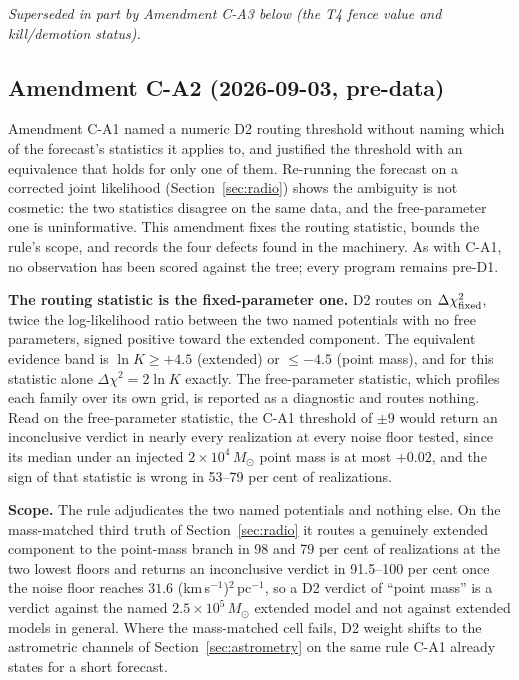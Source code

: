 \documentclass[11pt]{article}
\newcommand{\msun}{\ensuremath{M_\odot}}
\begin{document}
\textit{Superseded in part by Amendment C-A3 below (the T4 fence value and kill/demotion status).}

\subsection{Amendment C-A2 (2026-09-03, pre-data)}
\label{sec:amendmentca2}

Amendment C-A1 named a numeric D2 routing threshold without naming which of the forecast's statistics it applies to, and justified the threshold with an equivalence that holds for only one of them. Re-running the forecast on a corrected joint likelihood (Section~\ref{sec:radio}) shows the ambiguity is not cosmetic: the two statistics disagree on the same data, and the free-parameter one is uninformative. This amendment fixes the routing statistic, bounds the rule's scope, and records the four defects found in the machinery. As with C-A1, no observation has been scored against the tree; every program remains pre-D1.

\textbf{The routing statistic is the fixed-parameter one.} D2 routes on $\Delta\chi^{2}_{\rm fixed}$, twice the log-likelihood ratio between the two named potentials with no free parameters, signed positive toward the extended component. The equivalent evidence band is $\ln K \geq +4.5$ (extended) or $\leq -4.5$ (point mass), and for this statistic alone $\Delta\chi^{2} = 2\ln K$ exactly. The free-parameter statistic, which profiles each family over its own grid, is reported as a diagnostic and routes nothing. Read on the free-parameter statistic, the C-A1 threshold of $\pm9$ would return an inconclusive verdict in nearly every realization at every noise floor tested, since its median under an injected $2\times10^{4}\,\msun$ point mass is at most $+0.02$, and the sign of that statistic is wrong in 53--79 per cent of realizations.

\textbf{Scope.} The rule adjudicates the two named potentials and nothing else. On the mass-matched third truth of Section~\ref{sec:radio} it routes a genuinely extended component to the point-mass branch in 98 and 79 per cent of realizations at the two lowest floors and returns an inconclusive verdict in 91.5--100 per cent once the noise floor reaches $31.6$ (km\,s$^{-1}$)$^{2}$\,pc$^{-1}$, so a D2 verdict of ``point mass'' is a verdict against the named $2.5\times10^{5}\,\msun$ extended model and not against extended models in general. Where the mass-matched cell fails, D2 weight shifts to the astrometric channels of Section~\ref{sec:astrometry} on the same rule C-A1 already states for a short forecast.
\end{document}
